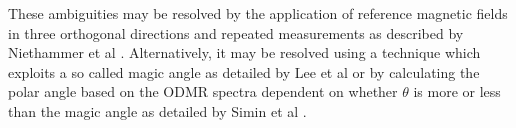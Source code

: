 These ambiguities may be resolved by the application of reference magnetic fields in three orthogonal directions and repeated measurements as described by Niethammer et al \cite{Niethammer2019}. Alternatively, it may be resolved using a technique which exploits a so called magic angle as detailed by Lee et al \cite{PhysRevB.92.115201} or by calculating the polar angle based on the ODMR spectra dependent on whether $\theta$ is more or less than the magic angle as detailed by Simin et al 
\cite{PhysRevApplied.4.014009}
. 

%
%
